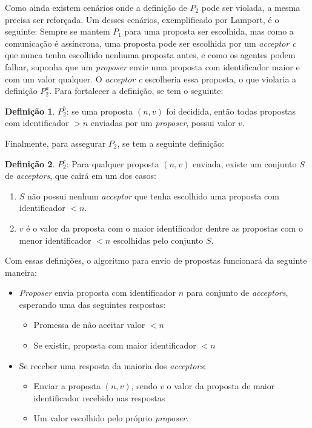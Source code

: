 \documentclass[
    12pt,
    openright, 
    oneside,
    a4paper,
    french,
    english,
    brazil
    ]{facom-ufu-abntex2}
\theoremstyle{definition}
\newtheorem{definition}{Definição}
\begin{document}
Como ainda existem cenários onde a definição de $P_2$ pode ser violada, a mesma precisa ser
reforçada. Um desses cenários, exemplificado por Lamport, é o seguinte:
Sempre se mantem $P_1$ para uma proposta ser escolhida, mas como
a comunicação é assíncrona, uma proposta pode ser escolhida por um \emph{acceptor c} 
que nunca tenha escolhido nenhuma proposta antes, e como os agentes podem falhar, suponha
que um \emph{proposer} envie uma proposta com identificador maior e com um valor qualquer.
O \emph{acceptor c} escolheria essa proposta, o que violaria a definição $P_2^a$. Para
fortalecer a definição, se tem o seguinte:

\begin{definition}
$P_2^b$: se uma proposta $(n, v)$ foi decidida, então todas propostas com identificador
$>n$ enviadas por um \emph{proposer}, possui valor $v$.
\end{definition}

Finalmente, para assegurar $P_2$, se tem a seguinte definição:

\begin{definition}
$P_2^c$: Para qualquer proposta $(n, v)$ enviada, existe um conjunto $S$ de
\emph{acceptors}, que cairá em um dos casos:

\begin{enumerate}
    \item $S$ não possui nenhum \emph{acceptor} que tenha escolhido uma proposta com 
identificador $<n$.

    \item $v$ é o valor da proposta com o maior identificador dentre as propostas com o 
menor identificador $<n$ escolhidas pelo conjunto $S$.
\end{enumerate}
\end{definition}

Com essas definições, o algoritmo para envio de propostas funcionará da seguinte maneira:

\begin{itemize}
    \item[]\emph{Proposer} envia proposta com identificador $n$ para conjunto de 
\emph{acceptors}, esperando uma das seguintes respostas:

    \begin{itemize}
        \item[] Promessa de não aceitar valor $<n$
        \item[] Se existir, proposta com maior identificador $<n$
    \end{itemize}
    
    \item[]Se receber uma resposta da maioria dos \emph{acceptors}:
    \begin{itemize}
        \item[] Enviar a proposta $(n, v)$, sendo $v$ o valor da proposta de maior identificador
        recebido nas respostas
        \item[] Um valor escolhido pelo próprio \emph{proposer}.
    \end{itemize}
\end{itemize}
\end{document}
